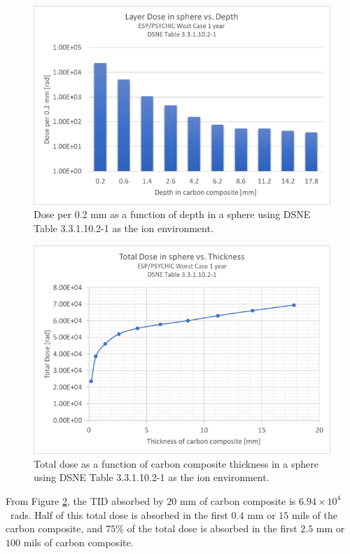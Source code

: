 \documentclass{hitec}
\begin{document}
\begin{figure}[h!]
	\centering
	\includegraphics[scale=0.9]{LayerDoseinSphere_vs_Depth.png}
	\caption{Dose per 0.2 mm as a function of depth in a sphere using DSNE Table 3.3.1.10.2-1 as the ion environment.}\label{fig:LayerDoseinSphere_vs_Depth}
\end{figure}

\begin{figure}[h!]
	\centering
	\includegraphics[scale=0.9]{TotalDoseinSphere_vs_Thickness.png}
	\caption{Total dose as a function of carbon composite thickness in a sphere using DSNE Table 3.3.1.10.2-1 as the ion environment.}\label{fig:TotalDoseinSphere_vs_Thickness}
\end{figure}

From Figure \ref{fig:TotalDoseinSphere_vs_Thickness}, the TID absorbed by $20$ mm of carbon composite is $6.94\times 10^{4}$~rads. Half of this total dose is absorbed in the first $0.4$ mm or $15$ mils of the carbon composite, and $75\%$ of the total dose is absorbed in the first $2.5$ mm or $100$ mils of carbon composite.
\end{document}
